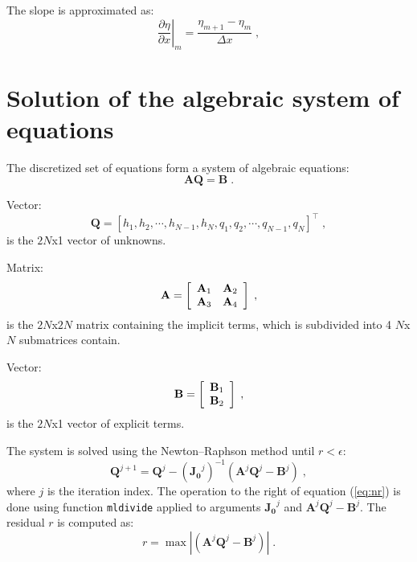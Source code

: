 \documentclass{deltares_report_elv}
\begin{document}
The slope is approximated as:
\begin{equation}
\left.\frac{\partial \eta}{\partial x}\right|_{m}=\frac{\eta_{m+1}-\eta_{m}}{\Delta x} \;,
\end{equation}




\section{Solution of the algebraic system of equations}

The discretized set of equations form a system of algebraic equations:
\begin{equation}
\label{eq:alg}
\mathbf{A}\mathbf{Q}=\mathbf{B}\;.
\end{equation}

Vector:
\begin{equation}
\mathbf{Q}=[h_1, h_2, \cdots, h_{N-1}, h_N, q_1, q_2, \cdots, q_{N-1}, q_N]^{\intercal} \;,
\end{equation}
is the $2N$x1 vector of unknowns. 

Matrix:
\begin{equation}
\makebox[\textwidth][c]{$
		\mathbf{A}=\left[
		\begin{array}{cc}
  \mathbf{A}_{1} & \mathbf{A}_{2} \\
	\mathbf{A}_{3} & \mathbf{A}_{4} \\
 \end{array}\right] \;,
$} 
\end{equation}
is the $2N$x$2N$ matrix containing the implicit terms, which is subdivided into 4 $N$x$N$ submatrices contain.

Vector:
\begin{equation}
\makebox[\textwidth][c]{$
		\mathbf{B}=\left[
		\begin{array}{cc}
  \mathbf{B}_{1}\\
	\mathbf{B}_{2}\\
 \end{array}\right] \;,
$} 
\end{equation}
is the $2N$x1 vector of explicit terms. 

The system is solved using the Newton–Raphson method until $r<\epsilon$:
\begin{equation}
\label{eq:nr}
\mathbf{Q}^{j+1}=\mathbf{Q}^{j}-(\mathbf{J_0}^{j})^{-1}\left(\mathbf{A}^{j}\mathbf{Q}^{j}-\mathbf{B}^{j}\right) \;,
\end{equation}
where $j$ is the iteration index. The operation to the right of equation (\ref{eq:nr}) is done using function \texttt{mldivide} applied to arguments $\mathbf{J_0}^{j}$ and $\mathbf{A}^{j}\mathbf{Q}^{j}-\mathbf{B}^{j}$. The residual $r$ is computed as:
\begin{equation}
r=\max{\left|\left(\mathbf{A}^{j}\mathbf{Q}^{j}-\mathbf{B}^{j}\right)\right|} \;.
\end{equation}
\end{document}
